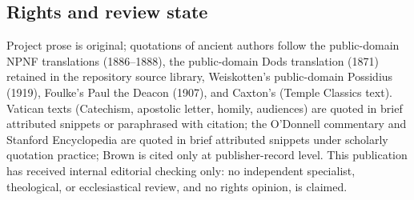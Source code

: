 \subsection{Rights and review state}

Project prose is original; quotations of ancient authors follow the
public-domain NPNF translations (1886--1888), the public-domain Dods
translation (1871) retained in the repository source library, Weiskotten's
public-domain Possidius (1919), Foulke's Paul the Deacon (1907), and
Caxton's  (Temple Classics text). Vatican texts
(Catechism, apostolic letter, homily, audiences) are quoted in brief
attributed snippets or paraphrased with citation; the O'Donnell commentary
and Stanford Encyclopedia are quoted in brief attributed snippets under
scholarly quotation practice; Brown is cited only at publisher-record
level. This publication has received internal editorial checking only: no
independent specialist, theological, or ecclesiastical review, and no
rights opinion, is claimed.
